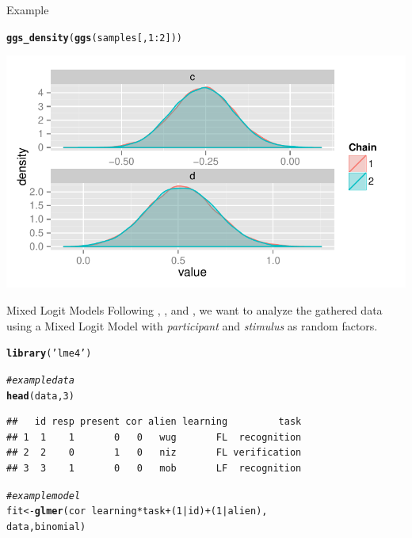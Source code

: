 \documentclass{beamer}\usepackage[]{graphicx}\usepackage[]{color}
\makeatletter
\def\maxwidth{ %
  \ifdim\Gin@nat@width>\linewidth
    \linewidth
  \else
    \Gin@nat@width
  \fi
}
\newcommand{\hlnum}[1]{\textcolor[rgb]{0.686,0.059,0.569}{#1}}%
\newcommand{\hlstr}[1]{\textcolor[rgb]{0.192,0.494,0.8}{#1}}%
\newcommand{\hlcom}[1]{\textcolor[rgb]{0.678,0.584,0.686}{\textit{#1}}}%
\newcommand{\hlopt}[1]{\textcolor[rgb]{0,0,0}{#1}}%
\newcommand{\hlstd}[1]{\textcolor[rgb]{0.345,0.345,0.345}{#1}}%
\newcommand{\hlkwb}[1]{\textcolor[rgb]{0.69,0.353,0.396}{#1}}%
\newcommand{\hlkwd}[1]{\textcolor[rgb]{0.737,0.353,0.396}{\textbf{#1}}}%
\newenvironment{kframe}{%
 \def\at@end@of@kframe{}%
 \ifinner\ifhmode%
  \def\at@end@of@kframe{\end{minipage}}%
  \begin{minipage}{\columnwidth}%
 \fi\fi%
 \def\FrameCommand##1{\hskip\@totalleftmargin \hskip-\fboxsep
 \colorbox{shadecolor}{##1}\hskip-\fboxsep
     \hskip-\linewidth \hskip-\@totalleftmargin \hskip\columnwidth}%
 \MakeFramed {\advance\hsize-\width
   \@totalleftmargin\z@ \linewidth\hsize
   \@setminipage}}%
 {\par\unskip\endMakeFramed%
 \at@end@of@kframe}
\newenvironment{knitrout}{}{} %
\makeatother
\begin{document}
\begin{frame}[fragile]{Example}
\begin{knitrout}
\color{fgcolor}\begin{kframe}
\begin{alltt}
\hlkwd{ggs_density}\hlstd{(}\hlkwd{ggs}\hlstd{(samples[,} \hlnum{1}\hlopt{:}\hlnum{2}\hlstd{]))}
\end{alltt}
\end{kframe}
\includegraphics[width=\maxwidth]{figure/plot-1} 

\end{knitrout}
\end{frame}

\begin{frame}[fragile]{Mixed Logit Models}
Following \textcite{jaeger2008categorical}, \textcite{baayen2008mixed}, and \textcite{judd2012treating}, we want to analyze the gathered data
using a Mixed Logit Model with \emph{participant} and \emph{stimulus} as random factors.




\begin{knitrout}
\color{fgcolor}\begin{kframe}
\begin{alltt}
\hlkwd{library}\hlstd{(}\hlstr{'lme4'}\hlstd{)}

\hlcom{# example data}
\hlkwd{head}\hlstd{(data,} \hlnum{3}\hlstd{)}
\end{alltt}
\begin{verbatim}
##   id resp present cor alien learning         task
## 1  1    1       0   0   wug       FL  recognition
## 2  2    0       1   0   niz       FL verification
## 3  3    1       0   0   mob       LF  recognition
\end{verbatim}
\begin{alltt}
\hlcom{# example model}
\hlstd{fit} \hlkwb{<-} \hlkwd{glmer}\hlstd{(cor} \hlopt{~} \hlstd{learning}\hlopt{*}\hlstd{task} \hlopt{+} \hlstd{(}\hlnum{1}\hlopt{|}\hlstd{id)} \hlopt{+} \hlstd{(}\hlnum{1}\hlopt{|}\hlstd{alien),}
                   \hlstd{data, binomial)}
\end{alltt}
\end{kframe}
\end{knitrout}
\end{frame}
\end{document}
